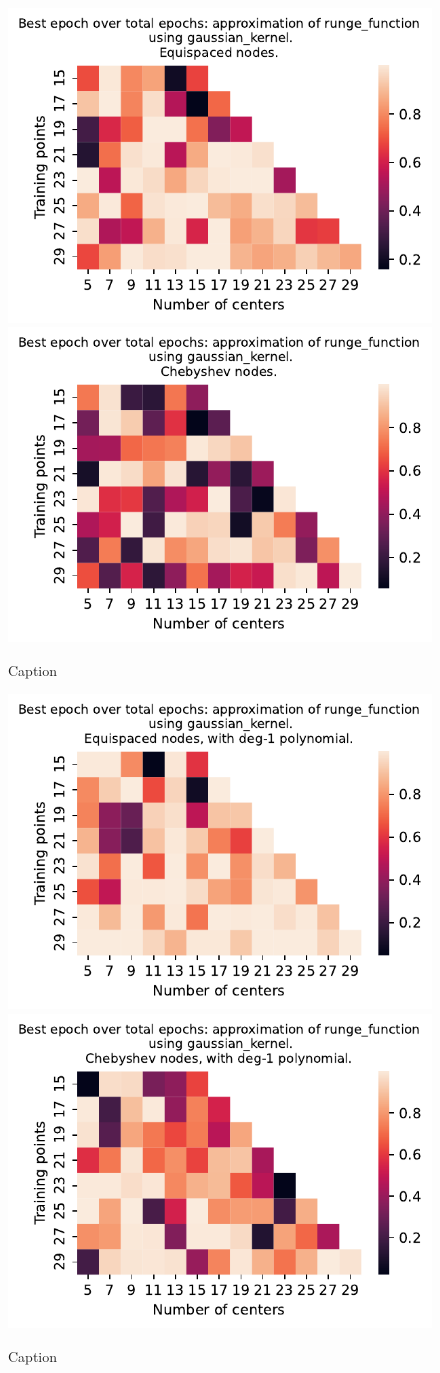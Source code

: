 \documentclass[12pt]{report} %
\begin{document}
\begin{figure}[ht]
  \centering

  \includegraphics[width=.49\textwidth]{imagenes/experiments/1d/variational_epochs/runge_function-Kgaussian_kernel-Equi-epochs.pdf}
  \includegraphics[width=.49\textwidth]{imagenes/experiments/1d/variational_epochs/runge_function-Kgaussian_kernel-Cheb-epochs.pdf}
  \caption{Caption}
  \label{fig:epochs-runge-gaussian}
\end{figure}


\begin{figure}[ht]
  \centering

  \includegraphics[width=.49\textwidth]{imagenes/experiments/1d/variational_epochs/runge_function-Kgaussian_kernel-Poly-Equi-epochs.pdf}
  \includegraphics[width=.49\textwidth]{imagenes/experiments/1d/variational_epochs/runge_function-Kgaussian_kernel-Poly-Cheb-epochs.pdf}
  \caption{Caption}
  \label{fig:epochs-runge-gaussian-poly}
\end{figure}
\end{document}
